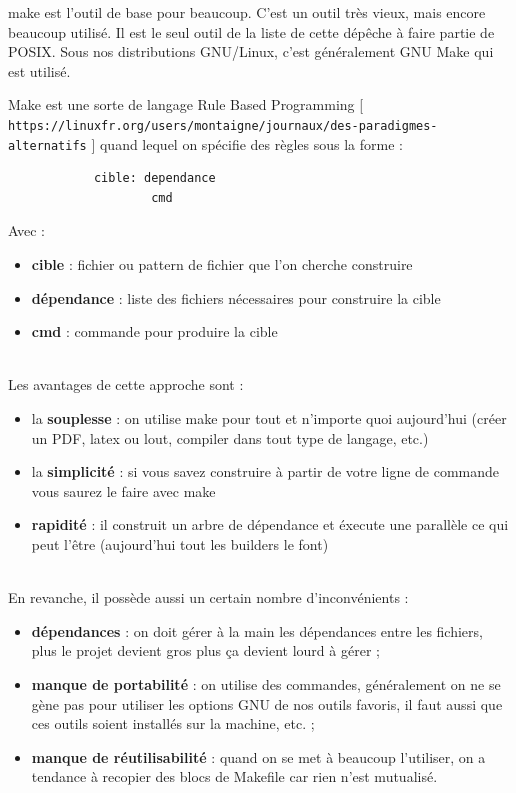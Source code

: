 \documentclass[11pt,twoside,a4paper]{article}
\begin{document}
make est l'outil de base pour beaucoup. C'est un outil tr{\`e}s vieux, mais encore beaucoup utilis{\'e}. Il est le seul outil de la liste de cette d{\'e}p{\^e}che {\`a} faire partie de POSIX. Sous nos distributions GNU/Linux, c'est g{\'e}n{\'e}ralement GNU Make qui est utilis{\'e}.

Make est une sorte de langage Rule Based Programming [ \texttt{https://linuxfr.org/users/montaigne/journaux/des-paradigmes-alternatifs} ] quand lequel on sp{\'e}cifie des r{\`e}gles sous la forme :
		\begin{verbatim}
			cible: dependance
					cmd
		\end{verbatim}

Avec :
\begin{itemize}
	\item \textbf{cible} : fichier ou pattern de fichier que l'on cherche construire
	\item \textbf{d{\'e}pendance} : liste des fichiers n{\'e}cessaires pour construire la cible
	\item \textbf{cmd} : commande pour produire la cible
\end{itemize}~\\

Les avantages de cette approche sont :
\begin{itemize}
	\item la \textbf{souplesse} : on utilise make pour tout et n'importe quoi aujourd'hui (cr{\'e}er un PDF, latex ou lout, compiler dans tout type de langage, etc.)
	\item la \textbf{simplicit{\'e}} : si vous savez construire {\`a} partir de votre ligne de commande vous saurez le faire avec make
	\item \textbf{rapidit{\'e}} : il construit un arbre de d{\'e}pendance et {\'e}xecute une parall{\`e}le ce qui peut l'{\^e}tre (aujourd'hui tout les builders le font)
\end{itemize}~\\

En revanche, il poss{\`e}de aussi un certain nombre d'inconv{\'e}nients :
\begin{itemize}
	\item \textbf{d{\'e}pendances} : on doit g{\'e}rer {\`a} la main les d{\'e}pendances entre les fichiers, plus le projet devient gros plus \c{c}a devient lourd {\`a} g{\'e}rer ;
	\item \textbf{manque de portabilit{\'e}} : on utilise des commandes, g{\'e}n{\'e}ralement on ne se g{\`e}ne pas pour utiliser les options GNU de nos outils favoris, il faut aussi que ces outils soient install{\'e}s sur la machine, etc. ;
	\item \textbf{manque de r{\'e}utilisabilit{\'e}} : quand on se met {\`a} beaucoup l'utiliser, on a tendance {\`a} recopier des blocs de Makefile car rien n'est mutualis{\'e}.
\end{itemize}~\\
\end{document}
